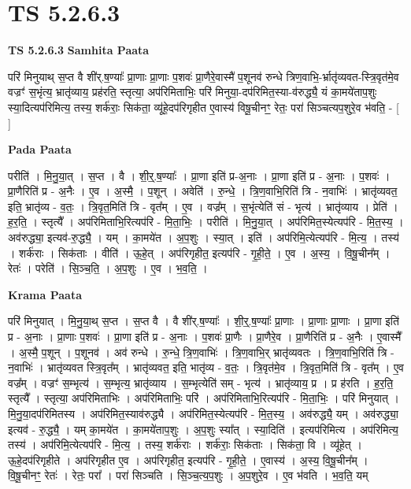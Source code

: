 \documentclass[17pt]{extarticle}
\begin{document}
\section{ TS 5.2.6.3 }

\textbf{TS 5.2.6.3 } \newline
\textbf{Samhita Paata} \newline

परि॑ मिनुयाथ् स॒प्त वै शी॑र्.ष॒ण्याः᳚ प्रा॒णाः प्रा॒णाः प॒शवः॑ प्रा॒णैरे॒वास्मै॑ प॒शूनव॑ रुन्धे त्रिण॒वाभि॒-र्भ्रातृ॑व्यवत-स्त्रि॒वृत॑मे॒व वज्रꣳ॑ स॒भृंत्य॒ भ्रातृ॑व्याय॒ प्रह॑रति॒ स्तृत्या॒ अप॑रिमिताभिः॒ परि॑ मिनुया॒-दप॑रिमित॒स्या-व॑रुद्ध्यै॒ यं का॒मये॑ताप॒शुः स्या॒दित्यप॑रिमित्य॒ तस्य॒ शर्क॑राः॒ सिक॑ता॒ व्यू॑हे॒दप॑रिगृहीत ए॒वास्य॑ विषू॒चीनꣳ॒॒ रेतः॒ परा॑ सिञ्चत्यप॒शुरे॒व भ॑वति॒ - [  ] \newline

\textbf{Pada Paata} \newline

परीति॑ । मि॒नु॒या॒त् । स॒प्त । वै । शी॒र्॒.ष॒ण्याः᳚ । प्रा॒णा इति॑ प्र-अ॒नाः । प्रा॒णा इति॑ प्र - अ॒नाः । प॒शवः॑ । प्रा॒णैरिति॑ प्र - अ॒नैः । ए॒व । अ॒स्मै॒ । प॒शून् । अवेति॑ । रु॒न्धे॒ । त्रि॒ण॒वाभि॒रिति॑ त्रि - न॒वाभिः॑ । भ्रातृ॑व्यवत॒ इति॒ भ्रातृ॑व्य - व॒तः॒ । त्रि॒वृत॒मिति॑ त्रि - वृत᳚म् । ए॒व । वज्र᳚म् । स॒भृंत्येति॑ सं - भृत्य॑ । भ्रातृ॑व्याय । प्रेति॑ । ह॒र॒ति॒ । स्तृत्यै᳚ । अप॑रिमिताभि॒रित्यप॑रि - मि॒ता॒भिः॒ । परीति॑ । मि॒नु॒या॒त् । अप॑रिमित॒स्येत्यप॑रि - मि॒त॒स्य॒ । अव॑रुद्ध्या॒ इत्यव॑-रु॒द्ध्यै॒ । यम् । का॒मये॑त । अ॒प॒शुः । स्या॒त् । इति॑ । अप॑रिमि॒त्येत्यप॑रि - मि॒त्य॒ । तस्य॑ । शर्क॑राः । सिक॑ताः । वीति॑ । ऊ॒हे॒त् । अप॑रिगृहीत॒ इत्यप॑रि - गृ॒ही॒ते॒ । ए॒व । अ॒स्य॒ । वि॒षू॒चीन᳚म् । रेतः॑ । परेति॑ । सि॒ञ्च॒ति॒ । अ॒प॒शुः । ए॒व । भ॒व॒ति॒ ।  \newline


\textbf{Krama Paata} \newline

परि॑ मिनुयात् । मि॒नु॒या॒थ् स॒प्त । स॒प्त वै । वै शी॑र्.ष॒ण्याः᳚ । शी॒र्॒.ष॒ण्याः᳚ प्रा॒णाः । प्रा॒णाः प्रा॒णाः । प्रा॒णा इति॑ प्र - अ॒नाः । प्रा॒णाः प॒शवः॑ । प्रा॒णा इति॑ प्र - अ॒नाः । प॒शवः॑ प्रा॒णैः । प्रा॒णैरे॒व । प्रा॒णैरिति॑ प्र - अ॒नैः । ए॒वास्मै᳚ । अ॒स्मै॒ प॒शून् । प॒शूनव॑ । अव॑ रुन्धे । रु॒न्धे॒ त्रि॒ण॒वाभिः॑ । त्रि॒ण॒वाभि॒र् भ्रातृ॑व्यवतः । त्रि॒ण॒वाभि॒रिति॑ त्रि - न॒वाभिः॑ । भ्रातृ॑व्यवत स्त्रि॒वृत᳚म् । भ्रातृ॑व्यवत॒ इति॒ भातृ॑व्य - व॒तः॒ । त्रि॒वृत॑मे॒व । त्रि॒वृत॒मिति॑ त्रि - वृत᳚म् । ए॒व वज्र᳚म् । वज्रꣳ॑ स॒म्भृत्य॑ । स॒म्भृत्य॒ भ्रातृ॑व्याय । स॒म्भृत्येति॑ सम् - भृत्य॑ । भ्रातृ॑व्याय॒ प्र । प्र ह॑रति । ह॒र॒ति॒ स्तृत्यै᳚ । स्तृत्या॒ अप॑रिमिताभिः । अप॑रिमिताभिः॒ परि॑ । अप॑रिमिताभि॒रित्यप॑रि - मि॒ता॒भिः॒ । परि॑ मिनुयात् । मि॒नु॒या॒दप॑रिमितस्य । अप॑रिमित॒स्याव॑रुद्ध्यै । अप॑रिमित॒स्येत्यप॑रि - मि॒त॒स्य॒ । अव॑रुद्ध्यै॒ यम् । अव॑रुद्ध्या॒ इत्यव॑ - रु॒द्ध्यै॒ । यम् का॒मये॑त । का॒मये॑ताप॒शुः । अ॒प॒शुः स्या᳚त् । स्या॒दिति॑ । इत्यप॑रिमित्य । अप॑रिमित्य॒ तस्य॑ । अप॑रिमि॒त्येत्यप॑रि - मि॒त्य॒ । तस्य॒ शर्क॑राः । शर्क॑राः॒ सिक॑ताः । सिक॑ता॒ वि । व्यू॑हेत् । ऊ॒हे॒दप॑रिगृहीते । अप॑रिगृहीत ए॒व । अप॑रिगृहीत॒ इत्यप॑रि - गृ॒ही॒ते॒ । ए॒वास्य॑ । अ॒स्य॒ वि॒षू॒चीन᳚म् । वि॒षू॒चीनꣳ॒॒ रेतः॑ । रेतः॒ परा᳚ । परा॑ सिञ्चति । सि॒ञ्च॒त्य॒प॒शुः । अ॒प॒शुरे॒व । ए॒व भ॑वति । भ॒व॒ति॒ यम् \newline
\end{document}
